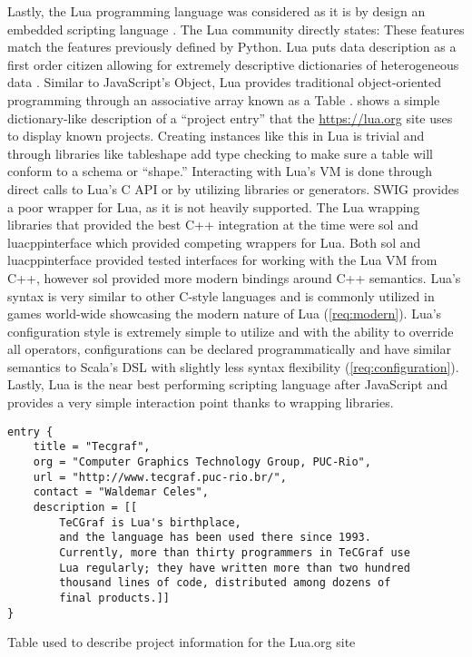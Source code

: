 Lastly, the Lua programming language was considered as it is by design an embedded scripting language \cite{Lua:Homepage}. The Lua community directly states:  These features match the features previously defined by Python. Lua puts data description as a first order citizen allowing for extremely descriptive dictionaries of heterogeneous data \cite{Ierusalimschy:PIL}. Similar to JavaScript's Object, Lua provides traditional object-oriented programming through an associative array known as a Table \cite{Ierusalimschy:PIL}.  shows a simple dictionary-like description of a ``project entry'' that the \url{https://lua.org} site uses to display known projects. Creating instances like this in Lua is trivial and through libraries like tableshape \cite{Github:leafto:tableshape} add type checking to make sure a table will conform to a schema or ``shape.'' Interacting with Lua's VM is done through direct calls to Lua's C API or by utilizing libraries or generators. SWIG provides a poor wrapper for Lua, as it is not heavily supported. The Lua wrapping libraries that provided the best C++ integration at the time were sol \cite{Github:Rapptz:Sol} and luacppinterface \cite{Github:davidsiaw:luacppinterface} which provided competing wrappers for Lua. Both sol and luacppinterface provided tested interfaces for working with the Lua VM from C++, however sol provided more modern bindings around C++ semantics. Lua's syntax is very similar to other C-style languages and is commonly utilized in games world-wide showcasing the modern nature of Lua (\cref{req:modern}). Lua's configuration style is extremely simple to utilize and with the ability to override all operators, configurations can be declared programmatically and have similar semantics to Scala's DSL with slightly less syntax flexibility (\cref{req:configuration}). Lastly, Lua is the near best performing scripting language after JavaScript and provides a very simple interaction point thanks to wrapping libraries. 

\begin{listing}[b!]
\begin{verbatim}
entry {
    title = "Tecgraf",
    org = "Computer Graphics Technology Group, PUC-Rio",
    url = "http://www.tecgraf.puc-rio.br/",
    contact = "Waldemar Celes",
    description = [[
        TeCGraf is Lua's birthplace,
        and the language has been used there since 1993.
        Currently, more than thirty programmers in TeCGraf use
        Lua regularly; they have written more than two hundred
        thousand lines of code, distributed among dozens of
        final products.]]
}
\end{verbatim}
\caption{Table used to describe project information for the Lua.org site \cite{Ierusalimschy:PIL}}
\label{lst:lua:project-example}
\end{listing}

